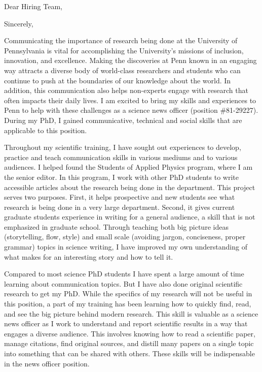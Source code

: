 \thispagestyle{empty}

\date{August 16, 2018}
\opening{Dear Hiring Team,}
\closing{Sincerely,}
\makelettertitle

Communicating the importance of research being done at the University of Pennsylvania is vital for accomplishing the University's missions of inclusion, innovation, and excellence. Making the discoveries at Penn known in an engaging way attracts a diverse body of world-class researchers and students who can continue to push at the boundaries of our knowledge about the world. In addition, this communication also helps non-experts engage with research that often impacts their daily lives. I am excited to bring my skills and experiences to Penn to help with these challenges as a science news officer (position \#81-29227). During my PhD, I gained communicative, technical and social skills that are applicable to this position.

Throughout my scientific training, I have sought out experiences to develop, practice and teach communication skills in various mediums and to various audiences.  I helped found the Students of Applied Physics program, where I am the senior editor. In this program, I work with other PhD students to write accessible articles about the research being done in the department. This project serves two purposes. First, it helps prospective and new students see what research is being done in a very large department. Second, it gives current graduate students experience in writing for a general audience, a skill that is not emphasized in graduate school. Through teaching both big picture ideas (storytelling, flow, style) and small scale (avoiding jargon, conciseness, proper grammar) topics in science writing, I have improved my own understanding of what makes for an interesting story and how to tell it.

Compared to most science PhD students I have spent a large amount of time learning about communication topics. But I have also done original scientific research to get my PhD. While the specifics of my research will not be useful in this position, a part of my training has been learning how to quickly find, read, and see the big picture behind modern research. This skill is valuable as a science news officer as I work to understand and report scientific results in a way that engages a diverse audience. This involves knowing how to read a scientific paper, manage citations, find original sources, and distill many papers on a single topic into something that can be shared with others. These skills will be indispensable in the news officer position.


